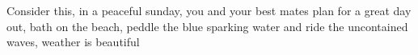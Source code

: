 Consider this, in a peaceful sunday, you and your best mates plan for a great day out, bath on the beach, peddle the blue sparking water and ride the uncontained waves, weather is beautiful 